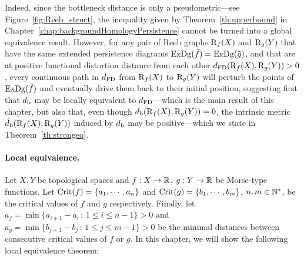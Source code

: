 Indeed, since the bottleneck distance is only a pseudometric---see Figure~\ref{fig:Reeb_struct}, the inequality 
given by Theorem~\ref{th:upperbound} in Chapter~\ref{chap:backgroundHomologyPersistence}
cannot be turned into a global equivalence result. However, for any pair of Reeb graphs $\mathrm{R}_f(X)$ and $\mathrm{R}_g(Y)$ 
that have the same extended persistence diagrams $\mathrm{ExDg}(\tilde f)=\mathrm{ExDg}(\tilde g)$, 
and that are at positive functional distortion distance from each other $d_{\rm FD}(\mathrm{R}_f(X),\mathrm{R}_g(Y))>0$, 
every continuous path in $d_{\rm FD}$ from $\mathrm{R}_f(X)$ to $\mathrm{R}_g(Y)$ will perturb the points of $\mathrm{ExDg}(\tilde f)$ 
and eventually drive them back to their initial position,
suggesting first that $d_{\rm b}$ may be locally equivalent to $d_{\rm FD}$---which is the main result of this chapter, 
but also that, even though $d_{\rm b}(\mathrm{R}_f(X),\mathrm{R}_g(Y))=0$, 
the intrinsic metric $\hat d_{\rm b}(\mathrm{R}_f(X),\mathrm{R}_g(Y))$ induced by $d_{\rm b}$ may be positive---which we state in Theorem~\ref{th:strongeq}. %



\paragraph*{Local equivalence.} Let $X,Y$ be topological spaces and $f:X\rightarrow\mathbb{R}$, $g:Y\rightarrow\mathbb{R}$ be Morse-type functions.
Let $\mathrm{Crit}(f)=\{a_1,\cdots,a_n\}$ and $\mathrm{Crit}(g)=\{b_1,\cdots,b_m\}$, $n,m\in\mathbb{N}^*$, be the critical values of $f$ and $g$ respectively.
Finally, let $a_f=\min\{a_{i+1}-a_i\,:\,1\leq i\leq n-1\} >0$ and $a_g=\min\{b_{j+1}-b_j\,:\,1\leq j\leq m-1\} >0$ be
the minimal distances between consecutive critical values of $f$ or $g$.
In this chapter, we will show the following local equivalence theorem:


